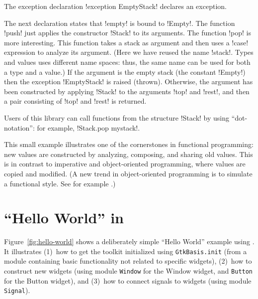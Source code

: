 \documentclass[finalversion]{usetex-v1}
\begin{document}
The exception declaration !exception EmptyStack! declares an
exception.

The next declaration states that !empty! is bound to !Empty!.  The
function !push! just applies the constructor !Stack! to its arguments.
The function !pop! is more interesting. This function takes a stack as argument
and then uses a !case! expression to analyze its argument.  (Here we have reused the name !stack!. Types and values uses
different name spaces: thus, the same name can be used for both a type
and a value.) 
If the argument is the empty stack (the constant !Empty!) then the
exception !EmptyStack! is raised (thrown). Otherwise, the argument
has been constructed by applying !Stack! to the arguments !top! and
!rest!, and then a pair consisting of !top! and !rest! is returned.

Users of this library can call functions from the structure
!Stack! by using ``dot-notation'': for example, !Stack.pop mystack!.

This small example illustrates one of the cornerstones in functional
programming: new values are constructed by analyzing,
composing, and sharing old values. This is in contrast to imperative and
object-oriented programming, where values are copied and modified.
(A new trend in object-oriented programming is to simulate a
functional style. See for example \cite[Item 13 and
14]{bloch01:effective-java}.)










\section{``Hello World'' in \mgtk}
\label{sec:example}

Figure~\ref{fig:hello-world} shows a deliberately simple ``Hello World''
example using \mgtk. It illustrates (1)~how to get the toolkit
initialized using \texttt{GtkBasis.init} (from a module containing
basic \gtk functionality not related to specific widgets), (2)~how to
construct new widgets (using module \texttt{Window} for the Window
widget, and \texttt{Button} for the Button widget), and (3)~how to
connect signals to widgets (using module \texttt{Signal}).
\end{document}
